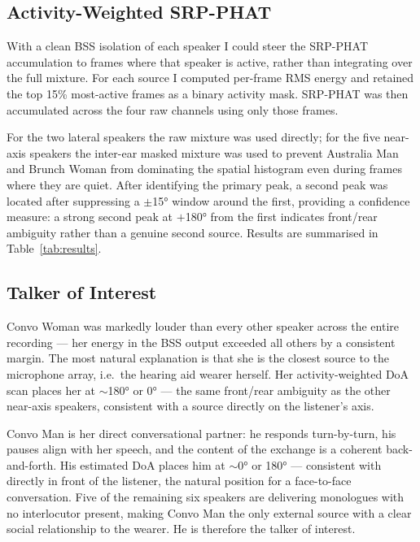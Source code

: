 \subsection{Activity-Weighted SRP-PHAT}

With a clean BSS isolation of each speaker I could steer the SRP-PHAT accumulation to frames where that speaker is active, rather than integrating over the full mixture. For each source I computed per-frame RMS energy and retained the top 15\% most-active frames as a binary activity mask. SRP-PHAT was then accumulated across the four raw channels using only those frames.

For the two lateral speakers the raw mixture was used directly; for the five near-axis speakers the inter-ear masked mixture was used to prevent Australia Man and Brunch Woman from dominating the spatial histogram even during frames where they are quiet. After identifying the primary peak, a second peak was located after suppressing a $\pm$15° window around the first, providing a confidence measure: a strong second peak at $+$180° from the first indicates front/rear ambiguity rather than a genuine second source. Results are summarised in Table~\ref{tab:results}.

\subsection{Talker of Interest}

Convo Woman was markedly louder than every other speaker across the entire recording — her energy in the BSS output exceeded all others by a consistent margin. The most natural explanation is that she is the closest source to the microphone array, i.e.\ the hearing aid wearer herself. Her activity-weighted DoA scan places her at $\sim$180° or 0° — the same front/rear ambiguity as the other near-axis speakers, consistent with a source directly on the listener's axis.

Convo Man is her direct conversational partner: he responds turn-by-turn, his pauses align with her speech, and the content of the exchange is a coherent back-and-forth. His estimated DoA places him at $\sim$0° or 180° — consistent with directly in front of the listener, the natural position for a face-to-face conversation. Five of the remaining six speakers are delivering monologues with no interlocutor present, making Convo Man the only external source with a clear social relationship to the wearer. He is therefore the talker of interest.

